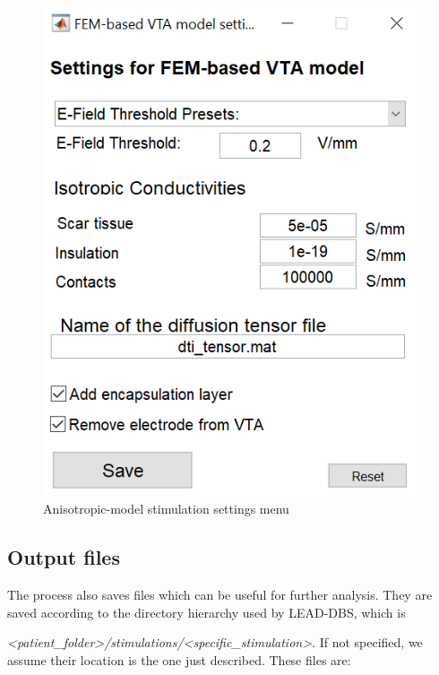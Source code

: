 \documentclass[a4paper,11pt]{article}
\begin{document}
\begin{figure}
\begin{center}
	\includegraphics{images/settings.png}
	\caption{Anisotropic-model stimulation settings menu}
	\label{fig:settings}
\end{center}
\end{figure}

\subsection{Output files}

The process also saves files which can be useful for further analysis. They are saved according to the directory hierarchy used by LEAD-DBS, which is 

\emph{<patient\_folder>/stimulations/<specific\_stimulation>}. If not specified, we assume their location is the one just described. These files are:
\end{document}
